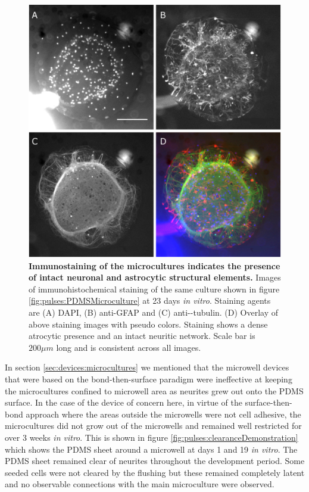    \begin{figure}[!htb]
       \centering
       \includegraphics[width=15cm]{chapter6/figures/PDMSMicrocultureStaining/PDMSMicrocultureStaining.jpg}
       \caption[Immunohistochemistry of microcultures in hybrid PDMS-tape devices]{\textbf{Immunostaining of the microcultures indicates the presence of intact neuronal and astrocytic structural elements.} Images of immunohistochemical staining of the same culture shown in figure \ref{fig:pulses:PDMSMicroculture} at 23 days \textit{in vitro}. Staining agents are (A) DAPI, (B) anti-GFAP and (C) anti-\textbeta-tubulin. (D) Overlay of above staining images with pseudo colors. Staining shows a dense atrocytic presence and an intact neuritic network. Scale bar is \(200 \mu m\) long and is consistent across all images.}
       \label{fig:pulses:PDMSMicrocultureStaining}
    \end{figure}

    In section \ref{sec:devices:microcultures} we mentioned that the microwell devices that were based on the bond-then-surface paradigm were ineffective at keeping the microcultures confined to microwell area as neurites grew out onto the PDMS surface. In the case of the device of concern here, in virtue of the surface-then-bond approach where the areas outside the microwells were not cell adhesive, the microcultures did not grow out of the microwells and remained well restricted for over 3 weeks \textit{in vitro}. This is shown in figure \ref{fig:pulses:clearanceDemonstration} which shows the PDMS sheet around a microwell at days 1 and 19 \textit{in vitro}. The PDMS sheet remained clear of neurites throughout the development period. Some seeded cells were not cleared by the flushing but these remained completely latent and no observable connections with the main microculture were observed.

